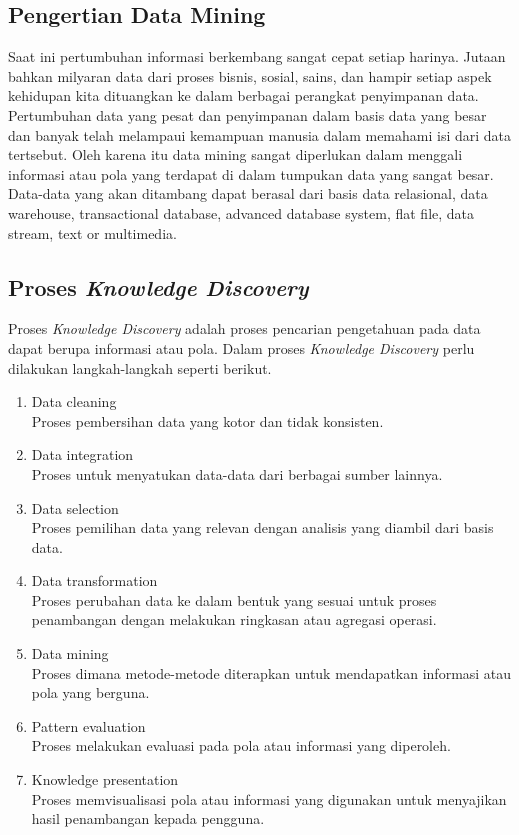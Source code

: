 \subsection{Pengertian Data Mining}
Saat ini pertumbuhan informasi berkembang sangat cepat setiap harinya. Jutaan bahkan milyaran data dari proses bisnis, sosial, sains, dan hampir setiap aspek kehidupan kita dituangkan ke dalam berbagai perangkat penyimpanan data. Pertumbuhan data yang pesat dan penyimpanan dalam basis data yang besar dan banyak telah melampaui kemampuan manusia dalam memahami isi dari data tertsebut. Oleh karena itu data mining sangat diperlukan dalam menggali informasi atau pola yang terdapat di dalam tumpukan data yang sangat besar. Data-data yang akan ditambang dapat berasal dari basis data relasional, data warehouse, transactional database, advanced database system, flat file, data stream, text or multimedia. \cite{han2011data} 

\subsection{Proses \textit{Knowledge Discovery}}
Proses \textit{Knowledge Discovery} adalah proses pencarian pengetahuan pada data dapat berupa informasi atau pola. Dalam proses \textit{Knowledge Discovery} perlu dilakukan langkah-langkah seperti berikut.

\begin{enumerate}
	\item Data cleaning \\Proses pembersihan data yang kotor dan tidak konsisten.
	\item Data integration \\Proses untuk menyatukan data-data dari berbagai sumber lainnya.
	\item Data selection \\Proses pemilihan data yang relevan dengan analisis yang diambil dari basis data.
	\item Data transformation \\Proses perubahan data ke dalam bentuk yang sesuai untuk proses penambangan dengan melakukan ringkasan atau agregasi operasi.
	\item Data mining \\Proses dimana metode-metode diterapkan untuk mendapatkan informasi atau pola yang berguna.
	\item Pattern evaluation \\Proses melakukan evaluasi pada pola atau informasi yang diperoleh.
	\item Knowledge presentation \\Proses memvisualisasi pola atau informasi yang digunakan untuk menyajikan hasil penambangan kepada pengguna.
\end{enumerate}


